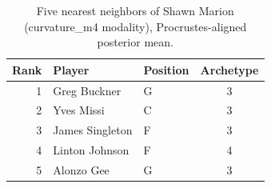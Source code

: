 \begin{table}[htbp]
  \centering\small
  \begin{tabular}{rllc}
    \toprule
    Rank & Player & Position & Archetype \\
    \midrule
    1 & Greg Buckner & G & 3 \\
    2 & Yves Missi & C & 3 \\
    3 & James Singleton & F & 3 \\
    4 & Linton Johnson & F & 4 \\
    5 & Alonzo Gee & G & 3 \\
    \bottomrule
  \end{tabular}
  \caption{Five nearest neighbors of Shawn Marion (curvature_m4 modality), Procrustes-aligned posterior mean.}
  \label{tab:Shawn_Marion_neighbors_curvature_m4}
\end{table}

